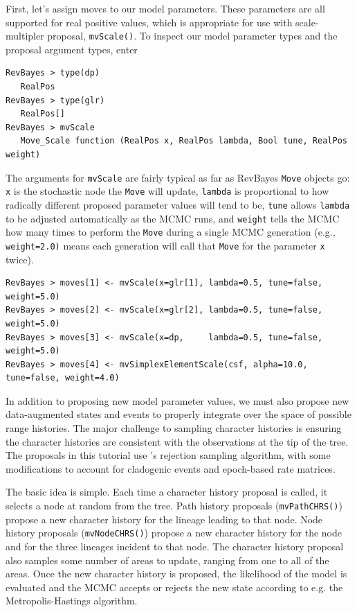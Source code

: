 First, let's assign moves to our model parameters.
These parameters are all supported for real positive values, which is appropriate for use with scale-multipler proposal, {\tt mvScale()}.
To inspect our model parameter types and the proposal argument types, enter

\begin{snugshade}
\begin{lstlisting}
RevBayes > type(dp)
   RealPos
RevBayes > type(glr)
   RealPos[]
RevBayes > mvScale
   Move_Scale function (RealPos x, RealPos lambda, Bool tune, RealPos weight)
\end{lstlisting}
\end{snugshade}

The arguments for {\tt mvScale} are fairly typical as far as RevBayes {\tt Move} objects go: {\tt x} is the stochastic node the {\tt Move} will update, {\tt lambda} is proportional to how radically different proposed parameter values will tend to be, {\tt tune} allows {\tt lambda} to be adjusted automatically as the MCMC runs, and {\tt weight} tells the MCMC how many times to perform the {\tt Move} during a single MCMC generation (e.g., {\tt weight=2.0)} means each generation will call that {\tt Move} for the parameter {\tt x} twice).


\begin{snugshade}
\begin{lstlisting}
RevBayes > moves[1] <- mvScale(x=glr[1], lambda=0.5, tune=false, weight=5.0)
RevBayes > moves[2] <- mvScale(x=glr[2], lambda=0.5, tune=false, weight=5.0)
RevBayes > moves[3] <- mvScale(x=dp, 	 lambda=0.5, tune=false, weight=5.0)
RevBayes > moves[4] <- mvSimplexElementScale(csf, alpha=10.0, tune=false, weight=4.0)
\end{lstlisting}
\end{snugshade}

In addition to proposing new model parameter values, we must also propose new data-augmented states and events to properly integrate over the space of possible range histories.
The major challenge to sampling character histories is ensuring the character histories are consistent with the observations at the tip of the tree.
The proposals in this tutorial use \citet{nielsen02}'s rejection sampling algorithm, with some modifications to account for cladogenic events and epoch-based rate matrices.

The basic idea is simple.
Each time a character history proposal is called, it selects a node at random from the tree.
Path history proposals ({\tt mvPathCHRS()}) propose a new character history for the lineage leading to that node.
Node history proposals ({\tt mvNodeCHRS()}) propose a new character history for the node and for the three lineages incident to that node.
The character history proposal also samples some number of areas to update, ranging from one to all of the areas.
Once the new character history is proposed, the likelihood of the model is evaluated and the MCMC accepts or rejects the new state according to e.g. the Metropolis-Hastings algorithm.

